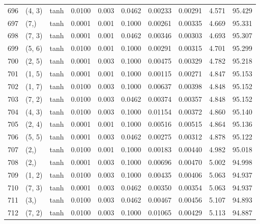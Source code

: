 \begin{tabular}{lllrrrrrrr}
696 &      (4, 3) &      tanh &  0.0100 &  0.003 &  0.0462 &          0.00233 &    0.00291 &       4.571 &    95.429 \\
697 &        (7,) &      tanh &  0.0001 &  0.001 &  0.1000 &          0.00261 &    0.00335 &       4.669 &    95.331 \\
698 &      (7, 3) &      tanh &  0.0001 &  0.001 &  0.0462 &          0.00346 &    0.00303 &       4.693 &    95.307 \\
699 &      (5, 6) &      tanh &  0.0100 &  0.001 &  0.1000 &          0.00291 &    0.00315 &       4.701 &    95.299 \\
700 &      (2, 5) &      tanh &  0.0001 &  0.003 &  0.1000 &          0.00475 &    0.00329 &       4.782 &    95.218 \\
701 &      (1, 5) &      tanh &  0.0001 &  0.001 &  0.1000 &          0.00115 &    0.00271 &       4.847 &    95.153 \\
702 &      (1, 7) &      tanh &  0.0100 &  0.003 &  0.1000 &          0.00637 &    0.00398 &       4.848 &    95.152 \\
703 &      (7, 2) &      tanh &  0.0100 &  0.003 &  0.0462 &          0.00374 &    0.00357 &       4.848 &    95.152 \\
704 &      (4, 3) &      tanh &  0.0100 &  0.003 &  0.1000 &          0.01154 &    0.00372 &       4.860 &    95.140 \\
705 &      (2, 4) &      tanh &  0.0001 &  0.001 &  0.1000 &          0.00516 &    0.00515 &       4.864 &    95.136 \\
706 &      (5, 5) &      tanh &  0.0001 &  0.003 &  0.0462 &          0.00275 &    0.00312 &       4.878 &    95.122 \\
707 &        (2,) &      tanh &  0.0100 &  0.001 &  0.1000 &          0.00183 &    0.00440 &       4.982 &    95.018 \\
708 &        (2,) &      tanh &  0.0001 &  0.003 &  0.1000 &          0.00696 &    0.00470 &       5.002 &    94.998 \\
709 &      (1, 2) &      tanh &  0.0100 &  0.003 &  0.1000 &          0.00435 &    0.00406 &       5.063 &    94.937 \\
710 &      (7, 3) &      tanh &  0.0001 &  0.003 &  0.0462 &          0.00350 &    0.00354 &       5.063 &    94.937 \\
711 &        (3,) &      tanh &  0.0100 &  0.003 &  0.0462 &          0.00467 &    0.00456 &       5.107 &    94.893 \\
712 &      (7, 2) &      tanh &  0.0100 &  0.003 &  0.1000 &          0.01065 &    0.00429 &       5.113 &    94.887 \\

\end{tabular}
